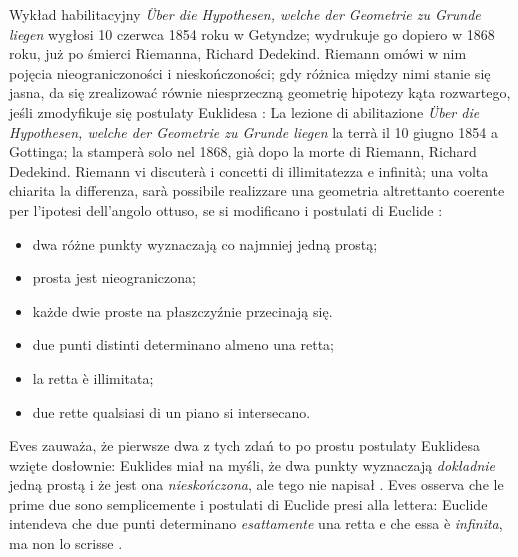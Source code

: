 Wykład habilitacyjny \emph{Über die Hypothesen, welche der Geometrie zu Grunde liegen} wygłosi 10 czerwca 1854 roku w Getyndze; wydrukuje go dopiero w 1868 roku, już po śmierci Riemanna, Richard Dedekind. %
Riemann omówi w nim pojęcia nieograniczoności i nieskończoności; gdy różnica między nimi stanie się jasna, da się zrealizować równie niesprzeczną geometrię hipotezy kąta rozwartego, jeśli zmodyfikuje się postulaty Euklidesa \cite[s. 287]{eves1_1972}: %
La lezione di abilitazione \emph{Über die Hypothesen, welche der Geometrie zu Grunde liegen} la terrà il 10 giugno 1854 a Gottinga; la stamperà solo nel 1868, già dopo la morte di Riemann, Richard Dedekind. %
Riemann vi discuterà i concetti di illimitatezza e infinità; una volta chiarita la differenza, sarà possibile realizzare una geometria altrettanto coerente per l'ipotesi dell'angolo ottuso, se si modificano i postulati di Euclide \cite[p. 287]{eves1_1972}: %
%
\begin{itemize}
\item dwa różne punkty wyznaczają co najmniej jedną prostą; %
\item prosta jest nieograniczona; %
\item każde dwie proste na płaszczyźnie przecinają się. %
\item due punti distinti determinano almeno una retta; %
\item la retta è illimitata; %
\item due rette qualsiasi di un piano si intersecano. %
\end{itemize}
Eves zauważa, że pierwsze dwa z tych zdań to po prostu postulaty Euklidesa wzięte dosłownie: Euklides miał na myśli, że dwa punkty wyznaczają \emph{dokładnie} jedną prostą i że jest ona \emph{nieskończona}, ale tego nie napisał \cite[s. 288]{eves1_1972}. %
Eves osserva che le prime due sono semplicemente i postulati di Euclide presi alla lettera: Euclide intendeva che due punti determinano \emph{esattamente} una retta e che essa è \emph{infinita}, ma non lo scrisse \cite[p. 288]{eves1_1972}. %

